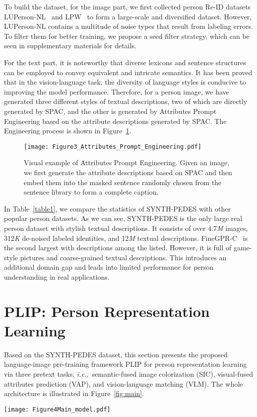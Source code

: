 \documentclass[10pt,twocolumn,letterpaper]{article}
\def\ie{{\it{i.e.,~}}}
\begin{document}
To build the dataset, for the image part, we first collected person Re-ID datasets LUPerson-NL~\cite{LUPnl} and LPW~\cite{LPW} to form a large-scale and diversified dataset. However, LUPerson-NL contains a multitude of noise types that result from labeling errors. To filter them for better training, we propose a seed filter strategy, which can be seen in supplementary materials for details.

For the text part, it is noteworthy that diverse lexicons and sentence structures can be employed to convey equivalent and intricate semantics. It has been proved that in the vision-language task, the diversity of language styles is conducive to improving the model performance. Therefore, for a person image, we have generated three different styles of textual descriptions, two of which are directly generated by SPAC, and the other is generated by Attributes Prompt Engineering based on the attribute descriptions generated by SPAC. The Engineering process is shown in Figure~\ref{fig:Attributes_eng}.

\begin{figure}[tbp]
\centering \texttt{[image: Figure3\_Attributes\_Prompt\_Engineering.pdf]}
\caption{Visual example of Attributes Prompt Engineering. Given an image, we first generate the attribute descriptions based on SPAC and then embed them into the masked sentence randomly chosen from the sentence library to form a complete caption.}
\label{fig:Attributes_eng}
\end{figure}
In Table~\ref{table1}, we compare the statistics of SYNTH-PEDES with other popular person datasets. As we can see, SYNTH-PEDES is the only large real person dataset with stylish textual descriptions. It consists of over 4.7\textit{M} images, 312\textit{K} de-noised labeled identities, and 12\textit{M} textual descriptions. FineGPR-C~\cite{VTBR} is the second largest with descriptions among the listed. However, it is full of game-style pictures and coarse-grained textual descriptions. This introduces an additional domain gap and leads into limited performance for person understanding in real applications.


 \section{PLIP: Person Representation Learning }
 Based on the SYNTH-PEDES dataset, this section presents the proposed language-image pre-training framework PLIP for person representation learning via three pretext tasks, \ie semantic-fused image colorization (SIC), visual-fused attributes prediction (VAP), and vision-language matching (VLM). The whole architecture is illustrated in Figure~\ref{fig:main}.
\begin{figure*}[htb]
\centering
	\texttt{[image: Figure4Main\_model.pdf]}
\caption{Overview of our proposed framework incorporating a semantic-fused image colorization task, a visual-fused attributes prediction task and a vision-language matching task.}
\label{fig:main}
\end{figure*}
\end{document}
